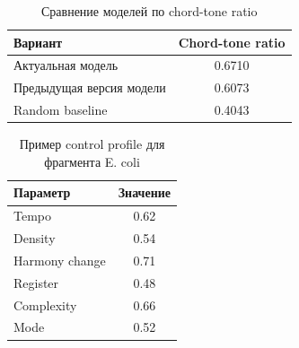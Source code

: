 \begin{table}[htbp]
\centering
\caption{Сравнение моделей по chord-tone ratio}
\label{tab:appendix-chord-tone}
\begin{tabular}{|p{}|c|}
\hline
\textbf{Вариант} & \textbf{Chord-tone ratio} \\
\hline
Актуальная модель & 0.6710 \\
\hline
Предыдущая версия модели & 0.6073 \\
\hline
Random baseline & 0.4043 \\
\hline
\end{tabular}
\end{table}

\begin{table}[htbp]
\centering
\caption{Пример control profile для фрагмента E. coli}
\label{tab:appendix-control-profile}
\begin{tabular}{|p{}|c|}
\hline
\textbf{Параметр} & \textbf{Значение} \\
\hline
Tempo & 0.62 \\
\hline
Density & 0.54 \\
\hline
Harmony change & 0.71 \\
\hline
Register & 0.48 \\
\hline
Complexity & 0.66 \\
\hline
Mode & 0.52 \\
\hline
\end{tabular}
\end{table}
